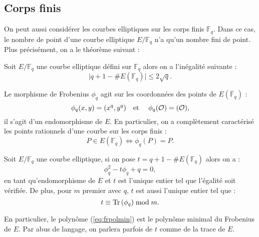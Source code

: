 \documentclass[a4paper]{article} %
\numberwithin{section}{part}
\numberwithin{equation}{section}
\newcommand\GF[1]{\mathbb{F}_{#1}}
\newcommand\Tr[1]{\textup{Tr}\left(#1\right)}
\newcommand\EO{\mathcal{O}}
\newcommand\etmath{\textup{\quad et \quad}}
\begin{document}
\subsection{Corps finis}
On peut aussi considérer les courbes elliptiques sur les corps finis $\GF{q}$.
Dans ce cas, le nombre de point d'une courbe elliptique $E/\GF{q}$ n'a qu'un
nombre fini de point. Plus précisément, on a le théorème suivant :
\begin{thm}[Hasse]
\label{th:hasse}
Soit $E/\GF{q}$ une courbe elliptique défini sur $\GF{q}$ alors on a l'inégalité
suivante :
\begin{equation}
\vert{q + 1 - \#E(\GF{q})}\vert\leq 2\sqrt{q}.
\end{equation}
\end{thm}
Le morphisme de Frobenius $\phi_q$ agit sur les coordonnées des points de
$E(\overline{\mathbb{F}}_q)$ :
\begin{equation}
\phi_q(x,y) = (x^q, y^q)\etmath \phi_q(\EO) = (\EO),
\end{equation}
il s'agit d'un endomorphisme de $E$. En particulier, on a complètement 
caractérisé les points rationnels d'une courbe sur les corps finis :
\begin{equation}
P\in E(\GF{q}) \Leftrightarrow \phi_q(P) = P.
\end{equation}
\begin{prop}
Soit $E/\GF{q}$ une courbe elliptique, si on pose $t = q + 1 - \#E(\GF{q})$
alors on a :
\begin{equation}
\label{eq:frpolmin}
\phi_q^2 - t\phi_q + q = 0,
\end{equation}
en tant qu'endomorphisme de $E$ et $t$ est l'unique entier tel que l'égalité
soit vérifiée. De plus, pour $m$ premier avec $q$, $t$ est aussi l'unique entier
tel que :
\begin{equation}
t \equiv \Tr{\phi_q} \bmod m.
\end{equation}
\end{prop}
En particulier, le polynôme (\ref{eq:frpolmin}) est le polynôme minimal du
Frobenius de $E$. Par abus de langage, on parlera parfois de $t$ comme de la 
trace de $E$.
\end{document}
